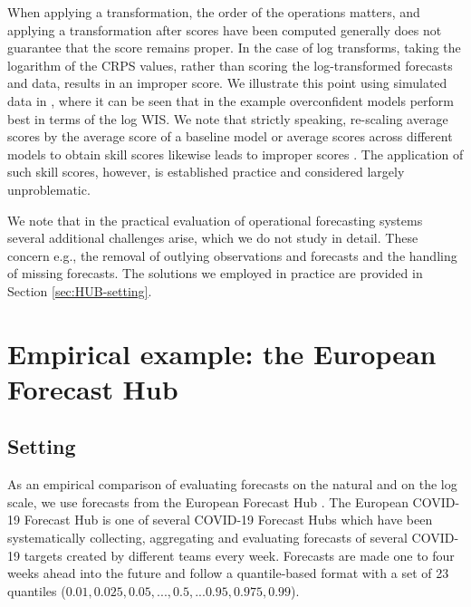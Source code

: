 \documentclass[10pt,letterpaper]{article}
\begin{document}
When applying a transformation, the order of the operations matters, and applying a transformation after scores have been computed generally does not guarantee that the score remains proper. In the case of log transforms, taking the logarithm of the CRPS values, rather than scoring the log-transformed forecasts and data, results in an improper score. We illustrate this point using simulated data in , where it can be seen that in the example overconfident models perform best in terms of the log WIS. We note that strictly speaking, re-scaling average scores by the average score of a baseline model or average scores across different models  to obtain skill scores likewise leads to improper scores \cite{gneitingStrictlyProperScoring2007}. The application of such skill scores, however, is established practice and considered largely unproblematic.

We note that in the practical evaluation of operational forecasting systems  several additional challenges arise, which we do not study in detail. These concern e.g., the removal of outlying observations and forecasts and the handling of missing forecasts. The solutions we employed in practice are provided in Section \ref{sec:HUB-setting}.

\section*{Empirical example: the European Forecast Hub}
\label{sec:HUB}

\subsection*{Setting}
\label{sec:HUB-setting}

As an empirical comparison of evaluating forecasts on the natural and on the log scale, we use forecasts from the European Forecast Hub \cite{europeancovid-19forecasthubEuropeanCovid19Forecast2021, sherrattPredictivePerformanceMultimodel2022}. 
The European COVID-19 Forecast Hub is one of several COVID-19 Forecast Hubs \cite{cramerEvaluationIndividualEnsemble2021, bracherShorttermForecastingCOVID192021} which have been systematically collecting, aggregating and evaluating forecasts of several COVID-19 targets created by different teams every week. Forecasts are made one to four weeks ahead into the future and follow a quantile-based format with a set of 23 quantiles ($0.01, 0.025, 0.05, ..., 0.5, ... 0.95, 0.975, 0.99$). 
\end{document}
